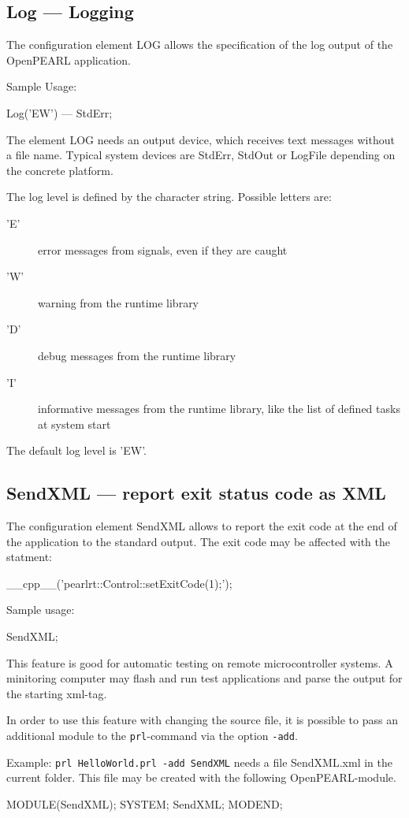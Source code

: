 
\subsection{Log --- Logging}
The configuration element LOG allows the specification of the 
log output of the OpenPEARL application.

Sample Usage:
\begin{PEARLCode}
Log('EW') --- StdErr;
\end{PEARLCode}

The element LOG needs an output device,
which receives text messages without a file name.
Typical system devices are StdErr, StdOut or LogFile depending on the concrete 
platform. 

The log level is defined by the character string. Possible letters are:
\begin{description}
\item['E'] error messages from signals, even if they are caught
\item['W'] warning from the runtime library
\item['D'] debug messages from the runtime library
\item['I'] informative messages from the runtime library, like the 
    list of defined tasks at system start
\end{description}

The default log level is 'EW'.

\subsection{SendXML --- report exit status code as XML}
The configuration element SendXML allows to report the 
exit code at the end of the application to the standard output.
The exit code may be affected with the statment:

\begin{PEARLCode}
__cpp__('pearlrt::Control::setExitCode(1);');
\end{PEARLCode}

Sample usage:
\begin{PEARLCode}
SendXML;
\end{PEARLCode}

This feature is good for automatic testing on remote microcontroller systems.
A minitoring computer may flash and run test applications and parse the output 
for the starting xml-tag.

In order to use this feature with changing the source file, it is possible to
 pass an additional module to the \texttt{prl}-command via the option \texttt{-add}.

Example:
\texttt{prl HelloWorld.prl -add SendXML} 
needs a file SendXML.xml in the current folder. 
This file may be created with the following OpenPEARL-module.

\begin{PEARLCode}
MODULE(SendXML);
SYSTEM;
   SendXML;
MODEND;
\end{PEARLCode}


